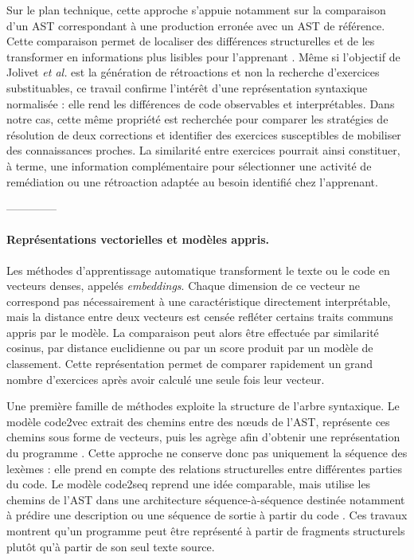 Sur le plan technique, cette approche s'appuie notamment sur la comparaison
d'un AST correspondant à une production erronée avec un AST de référence.
Cette comparaison permet de localiser des différences structurelles et de les
transformer en informations plus lisibles pour l'apprenant
\cite{jolivet_modelisation_2025}. Même si l'objectif de Jolivet \emph{et al.}
est la génération de rétroactions et non la recherche d'exercices
substituables, ce travail confirme l'intérêt d'une représentation
syntaxique normalisée : elle rend les différences de code observables et
interprétables. Dans notre cas, cette même propriété est recherchée pour
comparer les stratégies de résolution de deux corrections et identifier des
exercices susceptibles de mobiliser des connaissances proches. La similarité
entre exercices pourrait ainsi constituer, à terme, une information
complémentaire pour sélectionner une activité de remédiation ou une
rétroaction adaptée au besoin identifié chez l'apprenant.


--------------





\paragraph{Représentations vectorielles et modèles appris.}

Les méthodes d'apprentissage automatique transforment le texte ou le code en
vecteurs denses, appelés \emph{embeddings}. Chaque dimension de ce vecteur ne
correspond pas nécessairement à une caractéristique directement interprétable,
mais la distance entre deux vecteurs est censée refléter certains traits
communs appris par le modèle. La comparaison peut alors être effectuée par
similarité cosinus, par distance euclidienne ou par un score produit par un
modèle de classement. Cette représentation permet de comparer rapidement un
grand nombre d'exercices après avoir calculé une seule fois leur vecteur.

Une première famille de méthodes exploite la structure de l'arbre syntaxique.
Le modèle code2vec extrait des chemins entre des nœuds de l'AST, représente
ces chemins sous forme de vecteurs, puis les agrège afin d'obtenir une
représentation du programme \cite{alon_2019}. Cette approche ne conserve donc
pas uniquement la séquence des lexèmes : elle prend en compte des relations
structurelles entre différentes parties du code. Le modèle code2seq reprend
une idée comparable, mais utilise les chemins de l'AST dans une architecture
séquence-à-séquence destinée notamment à prédire une description ou une
séquence de sortie à partir du code \cite{alon_code2seq_2019}. Ces travaux
montrent qu'un programme peut être représenté à partir de fragments
structurels plutôt qu'à partir de son seul texte source.

